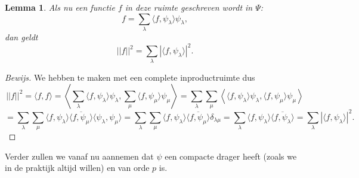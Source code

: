 \documentclass[11pt]{amsart}
\newtheorem*{lemma}{Lemma}
\begin{document}
\begin{lemma}
Als nu een functie $f$ in deze ruimte geschreven wordt in $\Psi$:
\[
f = \sum_{\lambda} \langle f, \psi_\lambda \rangle \psi_\lambda,
\]
dan geldt
\[
||f||^2 = \sum_{\lambda} | \langle f, \psi_\lambda \rangle |^2.
\]
\end{lemma}
\begin{proof}[Bewijs]
We hebben te maken met een complete inproductruimte dus
\[
||f||^2 = \langle f, f \rangle = \left\langle \sum_{\lambda} \langle f, \psi_\lambda \rangle \psi_\lambda, \sum_{\mu} \langle f, \psi_\mu \rangle \psi_\mu \right\rangle = \sum_{\lambda} \sum_{\mu} \left\langle \langle f, \psi_\lambda \rangle \psi_\lambda, \langle f, \psi_\mu \rangle \psi_\mu \right \rangle
\]
\[
 = \sum_\lambda \sum_\mu \langle f, \psi_\lambda \rangle \overline{\langle f, \psi_\mu \rangle}\langle \psi_\lambda, \psi_\mu \rangle = \sum_\lambda \sum_\mu \langle f, \psi_\lambda \rangle \overline{\langle f, \psi_\mu \rangle} \delta_{\lambda \mu} = \sum_\lambda \langle f, \psi_\lambda \rangle \overline{\langle f, \psi_\lambda \rangle} = \sum_\lambda |\langle f, \psi_\lambda \rangle |^2.
\]
\end{proof}

Verder zullen we vanaf nu aannemen dat $\psi$ een compacte drager heeft (zoals we in de praktijk altijd willen) en van orde $p$ is.
\end{document}
